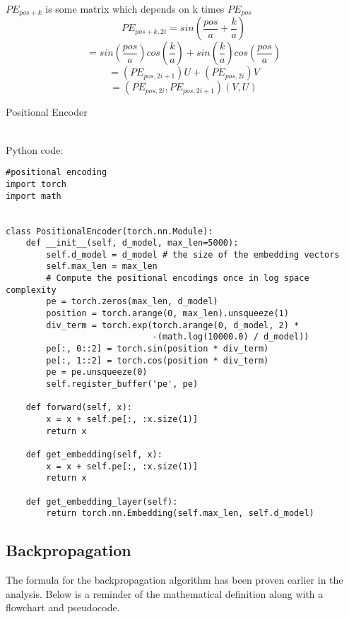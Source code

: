 \documentclass{article}
\begin{document}
$PE_{pos+k}$ is some matrix which depends on k times  $PE_{pos}$
$$PE_{pos+k, 2i} = sin(\frac{pos}{a}+\frac{k}{a})$$
$$ =sin(\frac{pos}{a})cos(\frac{k}{a})+sin(\frac{k}{a})cos(\frac{pos}{a})$$
$$ =(PE_{pos,2i+1})U+(PE_{pos,2i})V$$
$$ =(PE_{pos,2i},PE_{pos,2i+1})(V,U)$$

\begin{algorithm}
\caption{Positional Encoder}
\begin{algorithmic}[1]
\EndFor
\end{algorithmic}
\end{algorithm}


\\Python code:


\begin{lstlisting}
#positional encoding
import torch
import math


class PositionalEncoder(torch.nn.Module):
    def __init__(self, d_model, max_len=5000):
        self.d_model = d_model # the size of the embedding vectors
        self.max_len = max_len
        # Compute the positional encodings once in log space complexity
        pe = torch.zeros(max_len, d_model)
        position = torch.arange(0, max_len).unsqueeze(1)
        div_term = torch.exp(torch.arange(0, d_model, 2) *
                             -(math.log(10000.0) / d_model))
        pe[:, 0::2] = torch.sin(position * div_term)
        pe[:, 1::2] = torch.cos(position * div_term)
        pe = pe.unsqueeze(0)
        self.register_buffer('pe', pe)

    def forward(self, x):
        x = x + self.pe[:, :x.size(1)]
        return x

    def get_embedding(self, x):
        x = x + self.pe[:, :x.size(1)]
        return x

    def get_embedding_layer(self):
        return torch.nn.Embedding(self.max_len, self.d_model)

\end{lstlisting}
\clearpage
\subsection{Backpropagation}
The formula for the backpropagation algorithm has been proven earlier in the analysis. Below is a reminder of the mathematical definition along with a flowchart and pseudocode.
\end{document}
